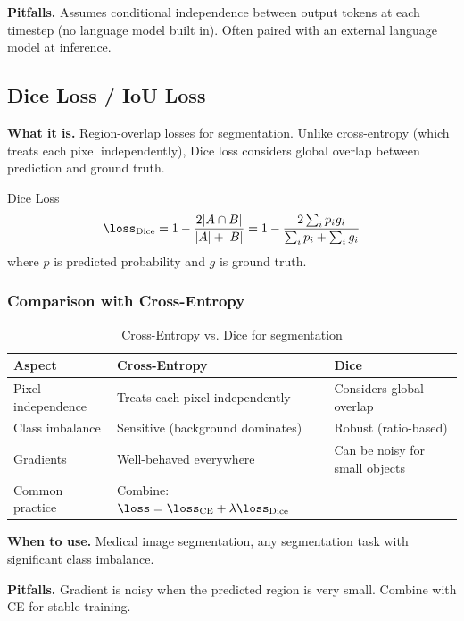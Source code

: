 \textbf{Pitfalls.} Assumes conditional independence between output tokens at each timestep (no language model built in). Often paired with an external language model at inference.

\subsection{Dice Loss / IoU Loss}

\textbf{What it is.} Region-overlap losses for segmentation. Unlike cross-entropy (which treats each pixel independently), Dice loss considers global overlap between prediction and ground truth.

\begin{mathresult}{Dice Loss}
\begin{equation}
\loss_{\text{Dice}} = 1 - \frac{2|A \cap B|}{|A| + |B|} = 1 - \frac{2\sum_i p_i g_i}{\sum_i p_i + \sum_i g_i}
\end{equation}
where $p$ is predicted probability and $g$ is ground truth.
\end{mathresult}

\subsubsection{Comparison with Cross-Entropy}

\begin{table}[H]
\centering
\caption{Cross-Entropy vs. Dice for segmentation}
\begin{tabularx}{\textwidth}{lXX}
\toprule
\textbf{Aspect} & \textbf{Cross-Entropy} & \textbf{Dice} \\
\midrule
Pixel independence & Treats each pixel independently & Considers global overlap \\
Class imbalance & Sensitive (background dominates) & Robust (ratio-based) \\
Gradients & Well-behaved everywhere & Can be noisy for small objects \\
Common practice & Combine: $\loss = \loss_{\text{CE}} + \lambda\loss_{\text{Dice}}$ & \\
\bottomrule
\end{tabularx}
\end{table}

\textbf{When to use.} Medical image segmentation, any segmentation task with significant class imbalance.

\textbf{Pitfalls.} Gradient is noisy when the predicted region is very small. Combine with CE for stable training.

